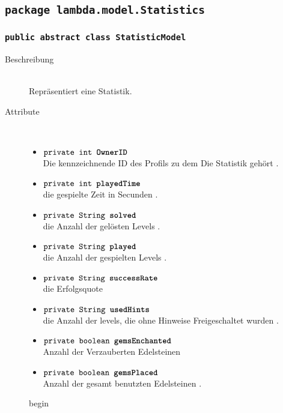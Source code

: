 \subsection{\texttt{package lambda.model.Statistics}}
		\subsubsection{\normalfont \texttt{public abstract class \textbf{StatisticModel}}} 
		
		\begin{description}
		
		\item[Beschreibung] \hfill \\ Repräsentiert eine Statistik.
		\item[Attribute] \hfill \\
			\vspace{-.8cm}
			\begin{itemize}
				\item $\texttt{private int \textbf{OwnerID}}$ \\ Die kennzeichnende ID des Profils zu dem Die Statistik gehört .
				\item $\texttt{private int \textbf{playedTime}}$ \\ die gespielte Zeit in Secunden .
				\item $\texttt{private String \textbf{solved}}$ \\ die Anzahl der gelösten Levels .
				\item $\texttt{private String \textbf{played}}$ \\ die Anzahl der gespielten Levels .
				\item $\texttt{private String \textbf{successRate}}$ \\die Erfolgsquote
				\item $\texttt{private String \textbf{usedHints}}$ \\  die Anzahl der levels, die ohne Hinweise Freigeschaltet wurden .
				\item $\texttt{private boolean \textbf{gemsEnchanted}}$ \\ Anzahl der Verzauberten Edelsteinen 
				\item $\texttt{private boolean \textbf{gemsPlaced}}$ \\ Anzahl der gesamt benutzten Edelsteinen .
			\end{itemize}
			
		begin
			

\end{description}
